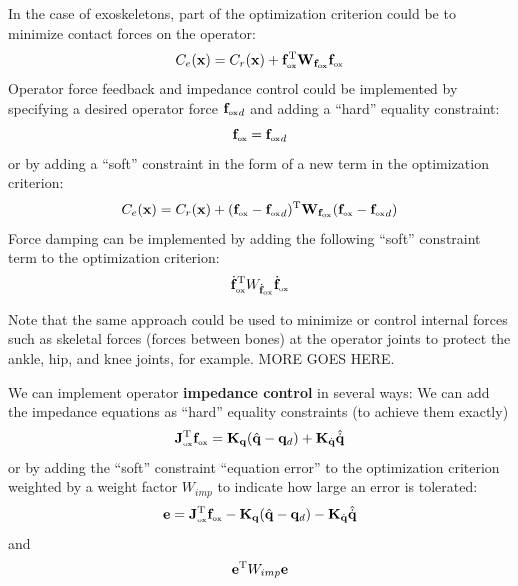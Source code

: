 \documentclass[letterpaper,12pt,fullpage]{article}
\newcommand{\ox}{{\mbox {\tiny ox}}}
\begin{document}
In the case of exoskeletons, 
part of the optimization criterion could be to
minimize contact forces on the operator:
\begin{equation}
C_e(\vx) = C_r(\vx) + \vf^{\tr}_{\ox} \mW_{\vf_{\ox}} \vf_{\ox}
\end{equation}
Operator force feedback and impedance control could be implemented by specifying a
desired operator force ${\vf_{\ox}}_d$ and adding a ``hard'' equality constraint:
\begin{equation}
\vf_{\ox} = {\vf_{\ox}}_d
\end{equation}
or by adding a ``soft'' constraint in the form of a new term in the optimization
criterion:
\begin{equation}
C_e(\vx) = C_r(\vx) + (\vf_{\ox} - {\vf_{\ox}}_d)^{\tr} \mW_{\vf_{\ox}} (\vf_{\ox} - {\vf_{\ox}}_d)
\end{equation}
Force damping can be implemented by adding the following ``soft'' constraint term
to the optimization criterion:
\begin{equation}
\dot{\vf}_{\ox}^{\tr} W_{\dot{\vf}_{\ox}} \dot{\vf}_{\ox}
\end{equation}

Note that the same approach could be used to minimize or control internal forces
such as skeletal forces (forces between bones) at the operator joints to protect
the ankle, hip, and knee joints, for example.
MORE GOES HERE.

We can implement operator {\bf impedance control} in several ways:
We can add 
the impedance equations as ``hard'' equality constraints (to achieve them exactly)
\begin{equation}
\mJ_{\ox}^{\tr} {\vf_{\ox}} = \mK_{\vq}( \hat{\vq} - \vq_d ) + \mK_{\dot{\vq}} \hat{\dot{\vq}}
\end{equation}
or by adding the ``soft'' constraint ``equation error'' to the optimization criterion
weighted by a weight factor $W_{imp}$ to indicate
how large an error is tolerated:
\begin{equation}
\ve = \mJ_{\ox}^{\tr} {\vf_{\ox}} - \mK_{\vq}( \hat{\vq} - \vq_d ) - \mK_{\dot{\vq}} \hat{\dot{\vq}}
\end{equation}
and
\begin{equation}
{\bf e}^{{\rm T}} W_{imp} {\bf e}
\end{equation}
\end{document}
